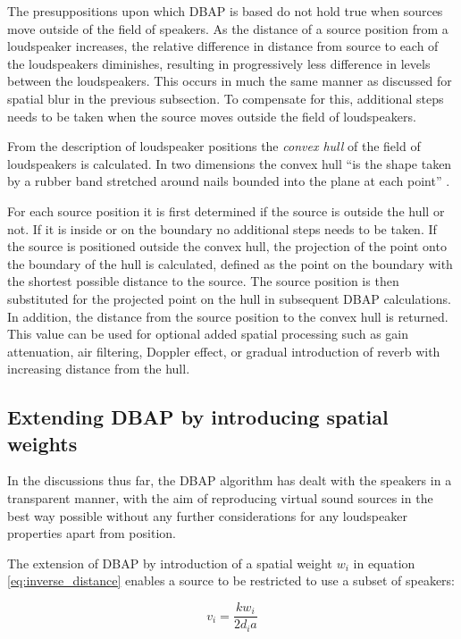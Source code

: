 \documentclass[twoside,10pt]{article}
\begin{document}
The presuppositions upon which DBAP is based do not hold true when sources move outside of the field of speakers. As the distance of a source position from a loudspeaker increases, the relative difference in distance from source to each of the loudspeakers diminishes, resulting in progressively less difference in levels between the loudspeakers.  This occurs in much the same manner as discussed for spatial blur in the previous subsection. To compensate for this, additional steps needs to be taken when the source moves outside the field of loudspeakers.

From the description of loudspeaker positions the \emph{convex hull} of the field of loudspeakers is calculated. In two dimensions the convex hull ``is the shape taken by a rubber band stretched around nails bounded into the plane at each point'' \cite{Rourke:1998_geometry}.

For each source position it is first determined if the source is outside the hull or not. If it is inside or on the boundary no additional steps needs to be taken. If the source is positioned outside the convex hull, the projection of the point onto the boundary of the hull is calculated, defined as the point on the boundary with the shortest possible distance to the source. The source position is then substituted for the projected point on the hull in subsequent DBAP calculations. In addition, the distance from the source position to the convex hull is returned. This value can be used for optional added spatial processing such as gain attenuation, air filtering, Doppler effect, or gradual introduction of reverb with increasing distance from the hull.




\subsection{Extending DBAP by introducing spatial weights}

In the discussions thus far, the DBAP algorithm has dealt with the speakers in a transparent manner, with the aim of reproducing virtual sound sources in the best way possible without any further considerations for any loudspeaker properties apart from position.

The extension of DBAP by introduction of a spatial weight $w_{i}$ in equation \ref{eq:inverse_distance} enables a source to be restricted to use a subset of speakers:

\begin{equation} \label{eq:inverse_distance_weighed}
v_{i} = \frac{k w_{i}}{2 d_{i} a} 
\end{equation}
\end{document}
